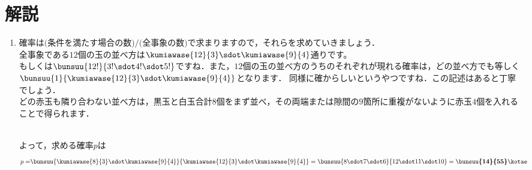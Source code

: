 \documentclass[../../../doc/main]{subfiles}
\begin{document}
    \setcounter{chapter}{2}
    \setcounter{section}{2}
    \section{解説}\label{解説2}
    \begin{enumerate}
        \item [\kakkoichi]
            \textcolor{myBlue2}{確率は$\text{(条件を満たす場合の数)}/\text{(全事象の数)}$で求まりますので，それらを求めていきましょう．} \\
            全事象である$12$個の玉の並べ方は$\kumiawase{12}{3}\sdot\kumiawase{9}{4}$通りです。 \\
            \textcolor{myBlue2}{もしくは$\bunsuu{12!}{3!\sdot4!\sdot5!}$ですね．また，$12$個の玉の並べ方のうちのそれぞれが現れる確率は，どの並べ方でも等しく$\bunsuu{1}{\kumiawase{12}{3}\sdot\kumiawase{9}{4}}$となります．
            同様に確からしいというやつですね．この記述はあると丁寧でしょう．}\\
            どの赤玉も隣り合わない並べ方は，黒玉と白玉合計$8$個をまず並べ，その両端または隙間の$9$箇所に重複がないように赤玉$4$個を入れることで得られます．
            \begin{figure}[htbp]
                \centering
            \end{figure}\\
            よって，求める確率$p$は
            \begin{align*}
            p=&\bunsuu{\kumiawase{8}{3}\sdot\kumiawase{9}{4}}{\kumiawase{12}{3}\sdot\kumiawase{9}{4}}=\bunsuu{8\sdot7\sdot6}{12\sdot11\sdot10}=\boldsymbol{\bunsuu{14}{55}}\kotae

\end{align*}
\end{enumerate}
\end{document}
